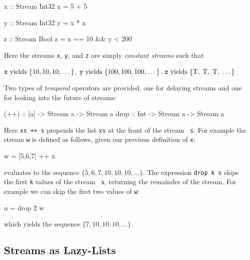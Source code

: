 \begin{code}
x :: Stream Int32
x = 5 + 5

y :: Stream Int32
y = x * x

z :: Stream Bool
z = x == 10 && y < 200
\end{code}

\noindent Here the streams {\tt x}, {\tt y}, and {\tt z} are simply
\emph{constant streams} such that

\begin{center}
$\mathtt{x} \textnormal{ yields } \{10, 10, 10, \dots \}$,
$\mathtt{y} \textnormal{ yields } \{100, 100, 100,  \dots \}$,
$\mathtt{z} \textnormal{ yields } \{\mbox{T},\; \mbox{T},\; \mbox{T},\; \dots \}$
\end{center}

Two types of \emph{temporal} operators are provided, one for delaying streams and one for
looking into the future of streams:
%
\begin{code}
(++) :: [a] -> Stream a -> Stream a
drop :: Int -> Stream a -> Stream a
\end{code}
%
Here {\tt xs ++ s} prepends the list {\tt xs} at the front of the stream {\tt
  s}.  For example the stream {\tt w} is defined as follows, given our previous
definition of {\tt x}:
%
\begin{code}
w = [5,6,7] ++ x
\end{code}
%
evaluates to the sequence
$\{5, 6, 7, 10, 10, 10, \dots\}$.
The expression {\tt drop k s} skips the first {\tt k} values of the stream {\tt
  s}, returning the remainder of the stream.  
For example we can skip the first two values of {\tt w}:
%
\begin{code}
u = drop 2 w
\end{code}
%
which yields the sequence
$\{7, 10, 10, 10, \dots\}$.

\subsection{Streams as Lazy-Lists} \label{sec:stream}

